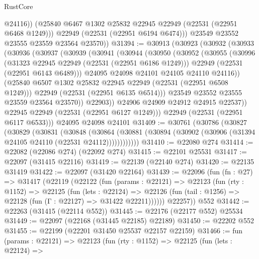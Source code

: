 \begin{lexlean}{RustCore}
\begin{coremodule}
              @24116))
          (@25840 @6467 @1302 @25832 @22945 @22949 (@22531 (@22951 @6468 @1249)))
          @22949
          (@22531 (@22951 @6194 @6474)))
        @23549
        @23552
        @23555
        @23559
        @23564
        @23570))
@31394 := @30913
    (@30923
      (@30932
        (@30933
          (@30936
            (@30937
              (@30939
                (@30941
                  (@30944
                    (@30950
                      (@30952
                        (@30955
                          (@30996
                            (@31323 @22945 @22949 (@22531 (@22951 @6186 @1249)))
                            @22949
                            (@22531 (@22951 @6143 @6489)))
                          @24095
                          @24098
                          @24101
                          @24105
                          @24110
                          @24116))
                      (@25840 @6507 @1302 @25832 @22945 @22949 (@22531 (@22951 @6508 @1249)))
                      @22949
                      (@22531 (@22951 @6135 @6514)))
                    @23549
                    @23552
                    @23555
                    @23559
                    @23564
                    @23570))
                @22903))
            @24906
            @24909
            @24912
            @24915
            @22537))
        @22945
        @22949
        (@22531 (@22951 @6127 @1249)))
      @22949
      (@22531 (@22951 @6117 @6533)))
    @24095
    @24098
    @24101
@31409 := @30761
    (@30786
      (@30827
        (@30829
          (@30831
            (@30848
              (@30864
                (@30881 (@30894 (@30902 (@30906 (@31394 @24105 @24110 (@22531 @24112))))))))))))
@31410 := @22080 @274
@31414 := @22082 (@22086 @274) (@22092 @274)
@31415 := @22101 @25531
@31417 := @22097 (@31415 @22116)
@31419 := @22139 (@22140 @274)
@31420 := @22135 @31419
@31422 := @22097 (@31420 @22164)
@31439 := @22096
    (fun (fn : @27) =>
    @31417
      (@22119
        (@22122
          (fun (params : @22121) =>
          @22123
            (fun (rty : @1152) =>
            @22125
              (fun (lets : @22124) =>
              @22126 (fun (tail : @1256) => @22128 (fun (Γ : @22127) => @31422 @22211))))))
        @22257))
    @552
@31442 := @22263 (@31415 (@22114 @552))
@31445 := @22176 (@22177 @552) @25534
@31449 := @22097 (@22168 (@31445 @22185) @22189)
@31450 := @22202 @552
@31455 := @22199 (@22201 @31450 @25537 @22157 @22159)
@31466 := fun (params : @22121) =>
  @22123
    (fun (rty : @1152) =>
    @22125
      (fun (lets : @22124) =>

\end{coremodule}
\end{lexlean}
